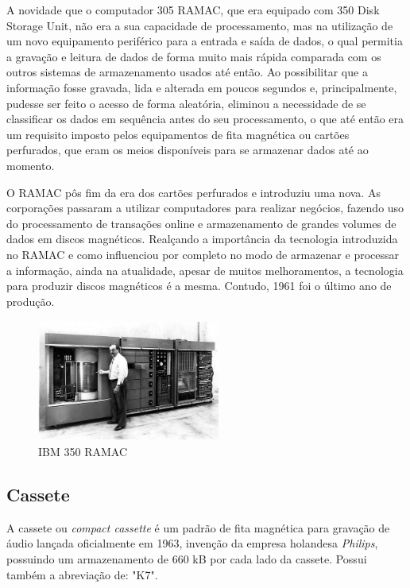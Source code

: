\documentclass{report}
\begin{document}
		A novidade que o computador 305 RAMAC, que era equipado com 350 Disk Storage Unit, não era a sua capacidade de processamento, mas na utilização de um novo equipamento periférico para a entrada e saída de dados, o qual permitia a gravação e leitura de dados de forma muito mais rápida comparada com os outros sistemas de armazenamento usados até então. Ao possibilitar que a informação fosse gravada, lida e alterada em poucos segundos e, principalmente, pudesse ser feito o acesso de forma aleatória, eliminou a necessidade de se classificar os dados em sequência antes do seu processamento, o que até então era um requisito imposto pelos equipamentos de fita magnética ou cartões perfurados, que eram os meios disponíveis para se armazenar dados até ao momento.
\vspace{1mm}

		 O RAMAC pôs fim da era dos cartões perfurados e introduziu uma nova. As corporações passaram a utilizar computadores para realizar negócios, fazendo uso do processamento de transações online e armazenamento de grandes volumes de dados em discos magnéticos. Realçando a importância da tecnologia introduzida no RAMAC e como influenciou por completo no modo de armazenar e processar a informação, ainda na atualidade, apesar de muitos melhoramentos, a tecnologia para produzir discos magnéticos é a mesma. Contudo, 1961 foi o último ano de produção.

	\begin{figure} [h]
		\centering
		\includegraphics[width=6cm, height=4cm]{RAMAC.jpg}
		\caption{IBM 350 RAMAC}
	\end{figure}
	
\newpage
		
		\subsection{Cassete}	
	A cassete ou \textit{compact cassette}  é um padrão de fita magnética para gravação de áudio lançada oficialmente em 1963, invenção da empresa holandesa \textit{Philips}, possuindo um armazenamento de 660 kB por cada lado da cassete. Possui também a abreviação de: "K7".
\vspace{1mm}
	
\end{document}
